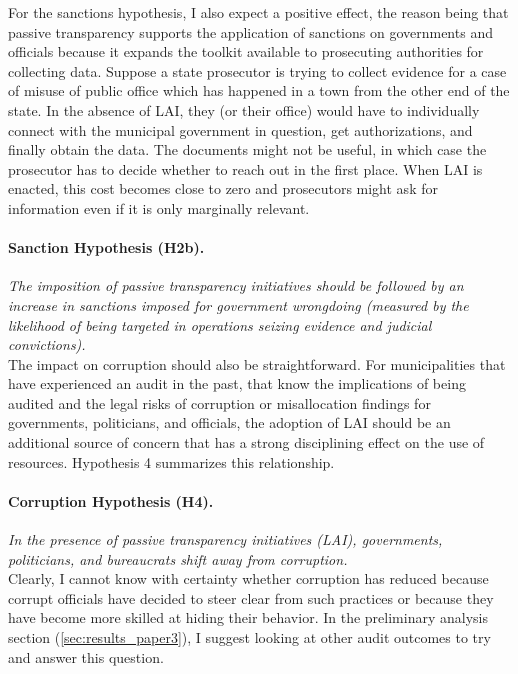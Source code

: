\documentclass[11pt]{article}
\begin{document}
For the sanctions hypothesis, I also expect a positive effect, the reason being that passive transparency supports the application of sanctions on governments and officials because it expands the toolkit available to prosecuting authorities for collecting data. Suppose a state prosecutor is trying to collect evidence for a case of misuse of public office which has happened in a town from the other end of the state. In the absence of LAI, they (or their office) would have to individually connect with the municipal government in question, get authorizations, and finally obtain the data. The documents might not be useful, in which case the prosecutor has to decide whether to reach out in the first place. When LAI is enacted, this cost becomes close to zero and prosecutors might ask for information even if it is only marginally relevant.

\paragraph{Sanction Hypothesis (H2b).} \emph{The imposition of passive transparency initiatives should be followed by an increase in sanctions imposed for government wrongdoing (measured by the likelihood of being targeted in operations seizing evidence and judicial convictions).} \\

The impact on corruption should also be straightforward. For municipalities that have experienced an audit in the past, that know the implications of being audited and the legal risks of corruption or misallocation findings for governments, politicians, and officials, the adoption of LAI should be an additional source of concern that has a strong disciplining effect on the use of resources. Hypothesis 4 summarizes this relationship.

\paragraph{Corruption Hypothesis (H4).} \emph{In the presence of passive transparency initiatives (LAI), governments, politicians, and bureaucrats shift away from corruption.} \\

Clearly, I cannot know with certainty whether corruption has reduced because corrupt officials have decided to steer clear from such practices or because they have become more skilled at hiding their behavior. In the preliminary analysis section (\ref{sec:results_paper3}), I suggest looking at other audit outcomes to try and answer this question.
\end{document}
